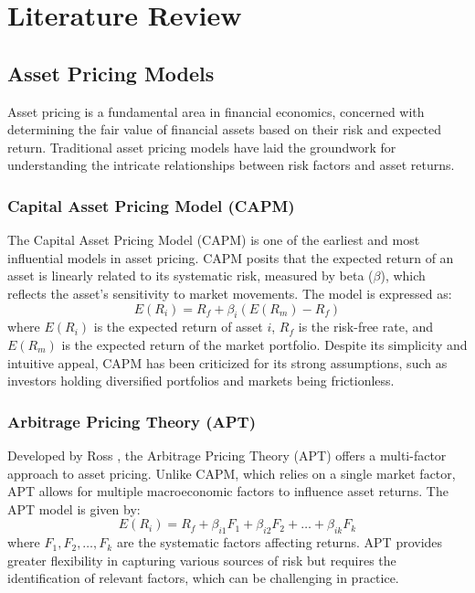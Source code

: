 \section{Literature Review}

\subsection{Asset Pricing Models}

Asset pricing is a fundamental area in financial economics, concerned with determining the fair value of financial assets based on their risk and expected return. Traditional asset pricing models have laid the groundwork for understanding the intricate relationships between risk factors and asset returns.

\subsubsection{Capital Asset Pricing Model (CAPM)}
The Capital Asset Pricing Model (CAPM) \cite{Sharpe1964, Lintner1965, Mossin1966} is one of the earliest and most influential models in asset pricing. CAPM posits that the expected return of an asset is linearly related to its systematic risk, measured by beta ($\beta$), which reflects the asset's sensitivity to market movements. The model is expressed as:
\[
E(R_i) = R_f + \beta_i (E(R_m) - R_f)
\]
where $E(R_i)$ is the expected return of asset $i$, $R_f$ is the risk-free rate, and $E(R_m)$ is the expected return of the market portfolio. Despite its simplicity and intuitive appeal, CAPM has been criticized for its strong assumptions, such as investors holding diversified portfolios and markets being frictionless.

\subsubsection{Arbitrage Pricing Theory (APT)}
Developed by Ross \cite{Ross1976}, the Arbitrage Pricing Theory (APT) offers a multi-factor approach to asset pricing. Unlike CAPM, which relies on a single market factor, APT allows for multiple macroeconomic factors to influence asset returns. The APT model is given by:
\[
E(R_i) = R_f + \beta_{i1}F_1 + \beta_{i2}F_2 + \dots + \beta_{ik}F_k
\]
where $F_1, F_2, \dots, F_k$ are the systematic factors affecting returns. APT provides greater flexibility in capturing various sources of risk but requires the identification of relevant factors, which can be challenging in practice.

